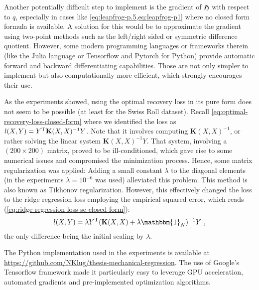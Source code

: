 Another potentially difficult step to implement is the gradient of $\mathfrak{H}$ with respect to $q$, especially in cases like \cref{eq:leapfrog-p.5,eq:leapfrog-p1} where no closed form formula is available.
A solution for this would be to approximate the gradient using two-point methods such as the left/right sided or symmetric difference quotient.
However, some modern programming languages or frameworks therein (like the Julia language or Tensorflow and Pytorch for Python) provide automatic forward and backward differentiating capabilities.
Those are not only simpler to implement but also computationally more efficient, which strongly encourages their use.

As the experiments showed, using the optimal recovery loss in its pure form does not seem to be possible (at least for the Swiss Roll dataset).
Recall \cref{eq:optimal-recovery-loss-closed-form} where we identified the loss as $l(X, Y) = Y^{\mathrm{T}} \mathbf{K}(X, X)^{-1} Y$.
Note that it involves computing $\mathbf{K}(X, X)^{-1}$, or rather solving the linear system $\mathbf{K}(X, X)^{-1} Y$.
That system, involving a $(200\times200)$ matrix, proved to be ill-conditioned, which gave rise to some numerical issues and compromised the minimization process.
Hence, some matrix regularization was applied:
Adding a small constant $\lambda$ to the diagonal elements (in the experiments $\lambda = 10^{-6}$ was used) alleviated this problem.
This method is also known as Tikhonov regularization.
However, this effectively changed the loss to the ridge regression loss employing the empirical squared error, which reads (\cref{eq:ridge-regression-loss-se-closed-form}):
\begin{equation}
	l(X, Y) = \lambda Y^\T (\mathbf{K}(X, X) + \lambda \mathbbm{1}_N)^{-1} Y \ ,
\end{equation}
the only difference being the initial scaling by $\lambda$.

The Python implementation used in the experiments is available at \url{https://github.com/NKlug/thesis-mechanical-regression}.
The use of Google's Tensorflow framework \cite{tensorflow15} made it particularly easy to leverage GPU acceleration, automated gradients and pre-implemented optimization algorithms.

